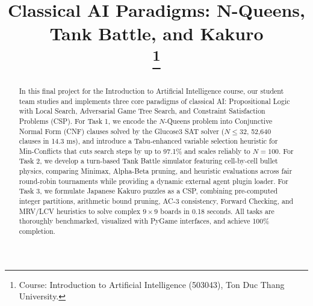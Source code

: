 \documentclass[conference]{IEEEtran}
\begin{document}
\title{Classical AI Paradigms: N-Queens, Tank Battle, and Kakuro\\
\thanks{Course: Introduction to Artificial Intelligence (503043), Ton Duc Thang University.}
}

\author{
    \and
    \and
}

\maketitle

\begin{abstract}
In this final project for the Introduction to Artificial Intelligence course, our student team studies and implements three core paradigms of classical AI: Propositional Logic with Local Search, Adversarial Game Tree Search, and Constraint Satisfaction Problems (CSP). For Task 1, we encode the $N$-Queens problem into Conjunctive Normal Form (CNF) clauses solved by the Glucose3 SAT solver ($N \le 32$, 52,640 clauses in 14.3 ms), and introduce a Tabu-enhanced variable selection heuristic for Min-Conflicts that cuts search steps by up to 97.1\% and scales reliably to $N=100$. For Task 2, we develop a turn-based Tank Battle simulator featuring cell-by-cell bullet physics, comparing Minimax, Alpha-Beta pruning, and heuristic evaluations across fair round-robin tournaments while providing a dynamic external agent plugin loader. For Task 3, we formulate Japanese Kakuro puzzles as a CSP, combining pre-computed integer partitions, arithmetic bound pruning, AC-3 consistency, Forward Checking, and MRV/LCV heuristics to solve complex $9 \times 9$ boards in 0.18 seconds. All tasks are thoroughly benchmarked, visualized with PyGame interfaces, and achieve 100\% completion.
\end{abstract}
\end{document}
